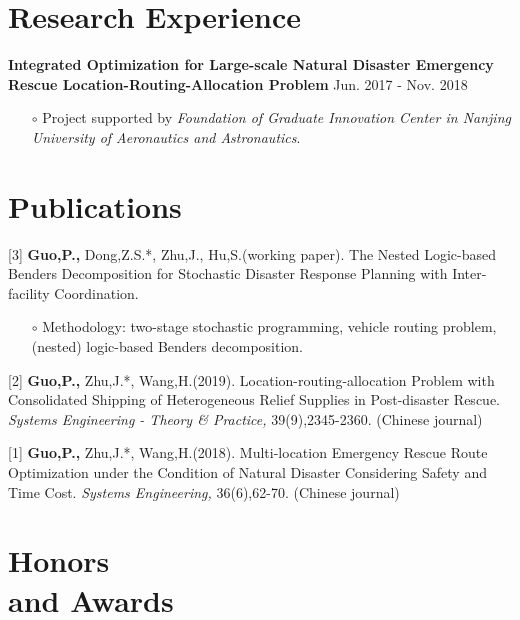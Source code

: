 \documentclass[margin]{res}
\begin{document}
\begin{resume}
\section{\sc Research Experience}

\textbf{{Integrated Optimization for Large-scale Natural Disaster Emergency Rescue Location-Routing-Allocation Problem}} \hspace{68pt} Jun. 2017 - Nov. 2018
\begin{itemize} \itemsep -2pt  %
\item[\(\circ\)] Project supported by {\it Foundation of Graduate Innovation Center in Nanjing University of Aeronautics and Astronautics}.
\end{itemize}




\section{\sc Publications}

[3] \textbf{Guo,P.,} Dong,Z.S.*, Zhu,J., Hu,S.(working paper). The Nested Logic-based Benders Decomposition for Stochastic Disaster Response Planning with Inter-facility Coordination.
\begin{itemize} \itemsep -2pt  %
\item[\(\circ\)] Methodology: two-stage stochastic programming, vehicle routing problem, (nested) logic-based Benders decomposition.
\end{itemize} \vspace{-.5em}

[2] \textbf{Guo,P.,} Zhu,J.*, Wang,H.(2019). Location-routing-allocation Problem with Consolidated Shipping of Heterogeneous Relief Supplies in Post-disaster Rescue. \textit{Systems Engineering - Theory \& Practice,} 39(9),2345-2360. (Chinese journal)

[1] \textbf{Guo,P.,} Zhu,J.*, Wang,H.(2018). Multi-location Emergency Rescue Route Optimization under the Condition of Natural Disaster Considering Safety and Time Cost. \textit{Systems Engineering,} 36(6),62-70. (Chinese journal) 






\section{\sc Honors \\and Awards}


\end{resume}
\end{document}
